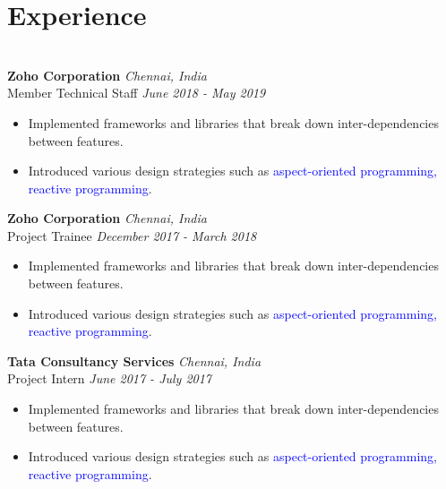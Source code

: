 \documentclass{resume}
\begin{document}
\section*{Experience}
\titlerule
\noindent
\\
\textbf{Zoho Corporation} \hfill \textit{Chennai, India} \\
{\small Member Technical Staff} \hfill \textit{\small June 2018 - May 2019}
\begin{itemize}[leftmargin=*, itemsep=0em, labelsep=0.05em]
  \item Implemented frameworks and libraries that break down inter-dependencies between features.
  \item Introduced various design strategies such as \textcolor{blue}{aspect-oriented programming,} \textcolor{blue}{reactive programming}.
\end{itemize}
\textbf{Zoho Corporation} \hfill \textit{Chennai, India} \\
{\small Project Trainee} \hfill \textit{\small December 2017 - March 2018}
\begin{itemize}[leftmargin=*, itemsep=0em, labelsep=0.05em]
  \item Implemented frameworks and libraries that break down inter-dependencies between features.
  \item Introduced various design strategies such as \textcolor{blue}{aspect-oriented programming,} \textcolor{blue}{reactive programming}.
\end{itemize}
\textbf{Tata Consultancy Services} \hfill \textit{Chennai, India} \\
{\small Project Intern} \hfill \textit{\small June 2017 - July 2017}
\begin{itemize}[leftmargin=*, itemsep=0em, labelsep=0.05em]
  \item Implemented frameworks and libraries that break down inter-dependencies between features.
  \item Introduced various design strategies such as \textcolor{blue}{aspect-oriented programming,} \textcolor{blue}{reactive programming}.
\end{itemize}
\end{document}
